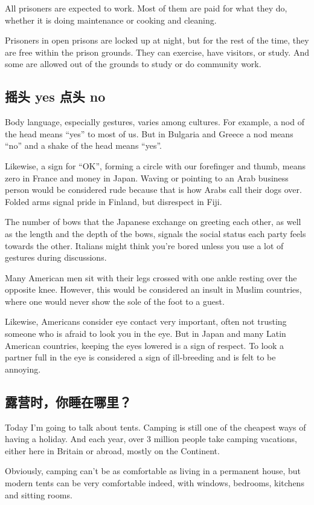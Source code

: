 All prisoners are expected to work. Most of them are
paid for what they do, whether it is doing maintenance or
cooking and cleaning.


Prisoners in open prisons are locked up at night, but for
the rest of the time, they are free within the prison grounds.
They can exercise, have visitors, or study. And some
are allowed out of the grounds to study or do community
work.
\subsection{摇头 yes 点头 no}
Body language, especially gestures, varies among cultures.
For example, a nod of the head means “yes” to most
of us. But in Bulgaria and Greece a nod means “no”
and a shake of the head means “yes”.

Likewise, a sign for “OK”, forming a circle with our forefinger
and thumb, means zero in France and money in Japan.
Waving or pointing to an Arab business person
would be considered rude because that is how Arabs call
their dogs over. Folded arms signal pride in Finland, but
disrespect in Fiji.

The number of bows that the Japanese exchange on
greeting each other, as well as the length and the depth of
the bows, signals the social status each party feels towards
the other. Italians might think you're bored unless you use
a lot of gestures during discussions.

Many American men sit with their legs crossed with one
ankle resting over the opposite knee. However, this
would be considered an insult in Muslim countries, where
one would never show the sole of the foot to a guest.

Likewise, Americans consider eye contact very important,
often not trusting someone who is afraid to look you in the
eye. But in Japan and many Latin American countries,
keeping the eyes lowered is a sign of respect. To look a
partner full in the eye is considered a sign of ill-breeding
and is felt to be annoying.

\subsection{露营时，你睡在哪里？}
Today I'm going to talk about tents. Camping is still
one of the cheapest ways of having a holiday. And each
year, over 3 million people take camping vacations, either
here in Britain or abroad, mostly on the Continent.

Obviously, camping can't be as comfortable as living in a
permanent house, but modern tents can be very comfortable
indeed, with windows, bedrooms, kitchens and sitting
rooms.

